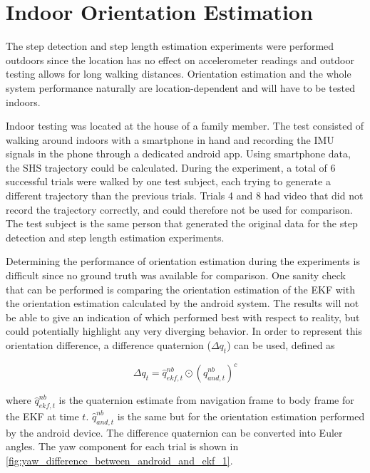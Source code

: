 \section{Indoor Orientation Estimation}

The step detection and step length estimation experiments were performed outdoors since the location has no effect on accelerometer readings and outdoor testing allows for long walking distances. Orientation estimation and the whole system performance naturally are location-dependent and will have to be tested indoors. \par

Indoor testing was located at the house of a family member. The test consisted of walking around indoors with a smartphone in hand and recording the IMU signals in the phone through a dedicated android app. Using smartphone data, the SHS trajectory could be calculated. During the experiment, a total of 6 successful trials were walked by one test subject, each trying to generate a different trajectory than the previous trials. Trials 4 and 8 had video that did not record the trajectory correctly, and could therefore not be used for comparison. The test subject is the same person that generated the original data for the step detection and step length estimation experiments.\par 

Determining the performance of orientation estimation during the experiments is difficult since no ground truth was available for comparison. One sanity check that can be performed is comparing the orientation estimation of the EKF with the orientation estimation calculated by the android system. The results will not be able to give an indication of which performed best with respect to reality, but could potentially highlight any very diverging behavior. In order to represent this orientation difference, a difference quaternion ($	\Delta q_t$) can be used, defined as \cite{Kok2017}

\begin{equation}
	\Delta q_t = \hat{q}_{ekf,t}^{nb} \odot \left( \hat{q}_{and,t}^{nb}  \right)^c
\end{equation} 

where $\hat{q}_{ekf,t}^{nb}$ is the quaternion estimate from navigation frame to body frame for the EKF at time $t$. $\hat{q}_{and,t}^{nb}$ is the same but for the orientation estimation performed by the android device. The difference quaternion can be converted into Euler angles. The yaw component for each trial is shown in  \cref{fig:yaw_difference_between_android_and_ekf_1}.

